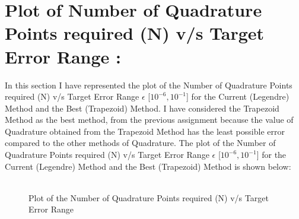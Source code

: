 \documentclass[12pt,a4paper]{article}
\begin{document}
\section{Plot of Number of Quadrature Points required (N) v/s Target Error Range :}
In this section I have represented the plot of the Number of Quadrature Points required (N) v/s Target Error Range $\epsilon$ [$10^{-6}, 10^{-1}$] for the Current (Legendre) Method and the Best (Trapezoid) Method. I have considered the Trapezoid Method as the best method, from the previous assignment because the value of Quadrature obtained from the Trapezoid Method has the least possible error compared to the other methods of Quadrature. The plot of the Number of Quadrature Points required (N) v/s Target Error Range $\epsilon$ [$10^{-6}, 10^{-1}$] for the Current (Legendre) Method and the Best (Trapezoid) Method is shown below:
\\ \\
\begin{figure}[!ht]
	\begin{center}
	\end{center}
	\caption{Plot of the Number of Quadrature Points required (N) v/s Target Error Range}
\end{figure}
\clearpage
\end{document}
